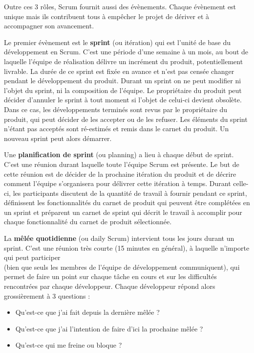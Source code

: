 \documentclass[12pt]{report}
\begin{document}
Outre ces 3 rôles, Scrum fournit aussi des évènements. Chaque évènement est unique mais ils contribuent tous à empêcher le projet de dériver et à accompagner son avancement.

Le premier évènement est le \textbf{sprint} (ou itération) qui est l'unité de base du développement en Scrum. C'est une période d'une semaine à un mois, au bout de laquelle l'équipe de réalisation délivre un incrément du produit, potentiellement livrable. La durée de ce sprint est fixée en avance et n'est pas censée changer pendant le développement du produit. Durant un sprint on ne peut modifier ni l'objet du sprint, ni la composition de l'équipe. Le propriétaire du produit peut décider d'annuler le sprint à tout moment si l'objet de celui-ci devient obsolète. Dans ce cas, les développements terminés sont revus par le propriétaire du produit, qui peut décider de les accepter ou de les refuser. Les éléments du sprint n'étant pas acceptés sont ré-estimés et remis dans le carnet du produit. Un nouveau sprint peut alors démarrer\cite{wikiscrum}.

Une \textbf{planification de sprint} (ou planning) a lieu à chaque début de sprint. C'est une réunion durant laquelle toute l'équipe Scrum est présente. Le but de cette réunion est de décider de la prochaine itération du produit et de décrire comment l'équipe s'organisera pour délivrer cette itération à temps. Durant celle-ci, les participants discutent de la quantité de travail à fournir pendant ce sprint, définissent les fonctionnalités du carnet de produit qui peuvent être complétées en un sprint et préparent un carnet de sprint qui décrit le travail à accomplir pour chaque fonctionnalité du carnet de produit sélectionnée.

La \textbf{mêlée quotidienne} (ou daily Scrum) intervient tous les jours durant un sprint. C'est une réunion très courte (15 minutes en général), à laquelle n'importe qui peut participer ~~\\ (bien que seuls les membres de l'équipe de développement communiquent), qui permet de faire un point sur chaque tâche en cours et sur les difficultés rencontrées par chaque développeur.
Chaque développeur répond alors grossièrement à 3 questions :
\begin{itemize}
\item Qu'est-ce que j'ai fait depuis la dernière mêlée ?
\item Qu'est-ce que j'ai l'intention de faire d'ici la prochaine mêlée ?
\item Qu'est-ce qui me freine ou bloque\cite{wikiscrum} ?
\end{itemize}
\end{document}
